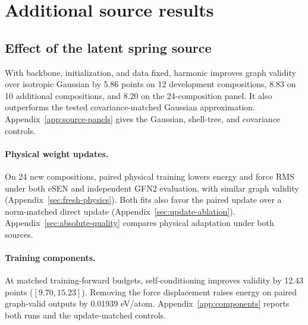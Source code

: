 \section{Additional source results}\label{app:additional-source-results}
\subsection{Effect of the latent spring source}
With backbone, initialization, and data fixed, harmonic improves graph validity over isotropic Gaussian by 5.86 points on 12 development compositions, 8.83 on 10 additional compositions, and 8.20 on the 24-composition panel. It also outperforms the tested covariance-matched Gaussian approximation. Appendix~\ref{app:source-panels} gives the Gaussian, shell-tree, and covariance controls.




\paragraph{Physical weight updates.}
On 24 new compositions, paired physical training lowers energy and force RMS under both eSEN and independent GFN2 evaluation, with similar graph validity (Appendix~\ref{sec:fresh-physics}). Both fits also favor the paired update over a norm-matched direct update (Appendix~\ref{sec:update-ablation}). Appendix~\ref{sec:absolute-quality} compares physical adaptation under both sources.

\paragraph{Training components.}
At matched training-forward budgets, self-conditioning improves validity by 12.43 points ($[9.70,15.23]$). Removing the force displacement raises energy on paired graph-valid outputs by 0.01939 eV/atom. Appendix~\ref{app:components} reports both runs and the update-matched controls.
